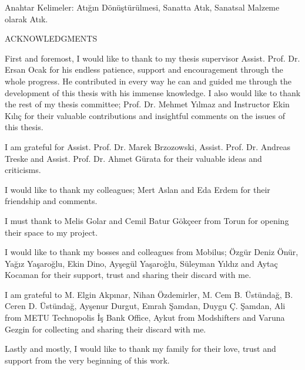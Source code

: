\documentclass[12pt]{report}
\begin{document}
\noindent Anahtar Kelimeler: Atığın Dönüştürülmesi, Sanatta Atık, Sanatsal Malzeme olarak Atık.
\clearpage


\thispagestyle{plain}
{}
\doublespacing
\begin{center}
	\vspace*{7mm}
	\MakeUppercase{ACKNOWLEDGMENTS}\\
    \vspace{3\baselineskip}
\end{center}
\par First and foremost, I would like to thank to my thesis supervisor Assist. Prof. Dr. Ersan Ocak for his endless patience, support and encouragement through the whole progress. He contributed in every way he can and guided me through the development of this thesis with his immense knowledge. I also would like to thank the rest of my thesis committee; Prof. Dr. Mehmet Yılmaz and Instructor Ekin Kılıç for their valuable contributions and insightful comments on the issues of this thesis.

I am grateful for Assist. Prof. Dr. Marek Brzozowski, Assist. Prof. Dr. Andreas Treske and Assist. Prof. Dr. Ahmet Gürata for their valuable ideas and criticisms.

I would like to thank my colleagues; Mert Aslan and Eda Erdem for their friendship and comments. 

I must thank to Melis Golar and Cemil Batur Gökçeer from Torun for opening their space to my project. 

I would like to thank my bosses and colleagues from Mobilus; Özgür Deniz Önür, Yağız Yaşaroğlu, Ekin Dino, Ayşegül Yaşaroğlu, Süleyman Yıldız and Aytaç Kocaman for their support, trust and sharing their discard with me.

I am grateful to M. Elgin Akpınar, Nihan Özdemirler, M. Cem B. Üstündağ, B. Ceren D. Üstündağ, Ayşenur Durgut, Emrah Şamdan, Duygu Ç. Şamdan, Ali from METU Technopolis İş Bank Office, Aykut from Modshifters and Varuna Gezgin for collecting and sharing their discard with me. 

Lastly and mostly, I would like to thank my family for their love, trust and support from the very beginning of this work. 
\clearpage


{}
\end{document}
